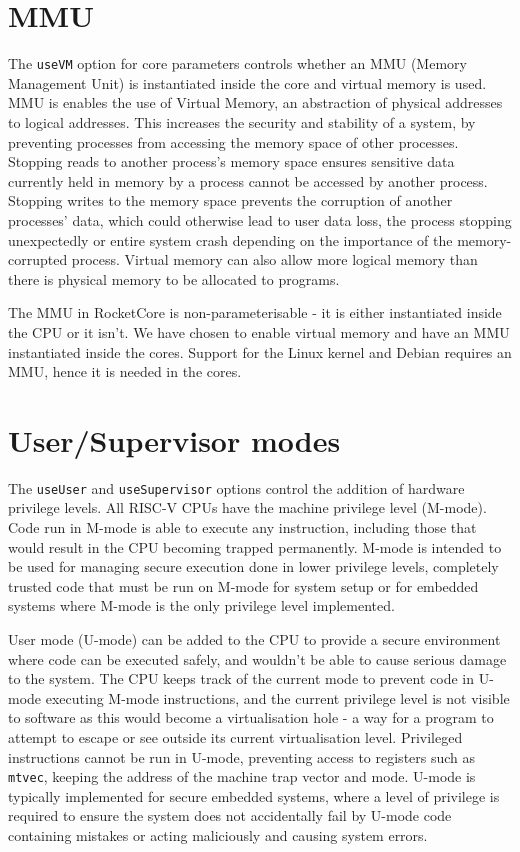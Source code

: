 \section{MMU}
The \texttt{useVM} option for core parameters controls whether an MMU (Memory Management Unit) is instantiated inside the core and virtual memory is used. MMU is enables the use of Virtual Memory, an abstraction of physical addresses to logical addresses. This increases the security and stability of a system, by preventing processes from accessing the memory space of other processes. Stopping reads to another process's memory space ensures sensitive data currently held in memory by a process cannot be accessed by another process. Stopping writes to the memory space prevents the corruption of another processes' data, which could otherwise lead to user data loss, the process stopping unexpectedly or entire system crash depending on the importance of the memory-corrupted process. Virtual memory can also allow more logical memory than there is physical memory to be allocated to programs.

The MMU in RocketCore is non-parameterisable - it is either instantiated inside the CPU or it isn't. We have chosen to enable virtual memory and have an MMU instantiated inside the cores. Support for the Linux kernel and Debian requires an MMU, hence it is needed in the cores. %

\section{User/Supervisor modes}
The \texttt{useUser} and \texttt{useSupervisor} options control the addition of hardware privilege levels. All RISC-V CPUs have the machine privilege level (M-mode). Code run in M-mode is able to execute any instruction, including those that would result in the CPU becoming trapped permanently. M-mode is intended to be used for managing secure execution done in lower privilege levels, completely trusted code that must be run on M-mode for system setup or for embedded systems where M-mode is the only privilege level implemented.

User mode (U-mode) can be added to the CPU to provide a secure environment where code can be executed safely, and wouldn't be able to cause serious damage to the system. The CPU keeps track of the current mode to prevent code in U-mode executing M-mode instructions, and the current privilege level is not visible to software as this would become a virtualisation hole - a way for a program to attempt to escape or see outside its current virtualisation level. Privileged instructions cannot be run in U-mode, preventing access to registers such as \texttt{mtvec}, keeping the address of the machine trap vector and mode. U-mode is typically implemented for secure embedded systems, where a level of privilege is required to ensure the system does not accidentally fail by U-mode code containing mistakes or acting maliciously and causing system errors.

